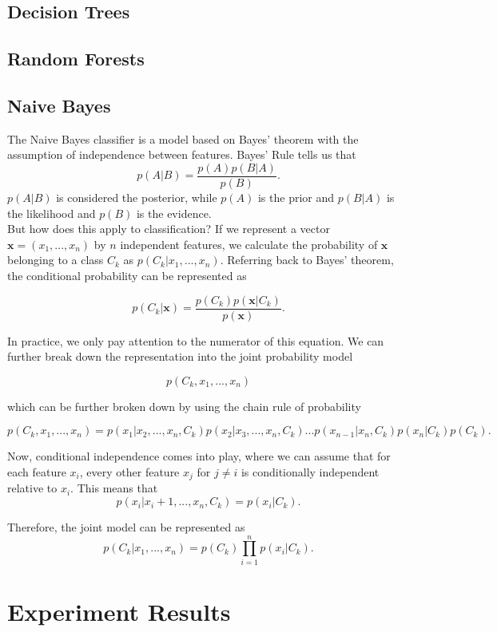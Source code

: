 \documentclass[11pt, letterpaper]{article}
\renewcommand{\vec}[1]{\mathbf{#1}}
\begin{document}
\subsection{Decision Trees}

\subsection{Random Forests}

\subsection{Naive Bayes}

The Naive Bayes classifier is a model based on Bayes' theorem with the assumption of independence between features. Bayes' Rule tells us that
$$p(A | B) = \frac{p(A)p(B | A) }{p(B)}.$$
$p(A|B)$ is considered the posterior, while $p(A)$ is the prior and $p(B | A)$ is the likelihood and $p(B)$ is the evidence. \\

But how does this apply to classification? If we represent a vector $\vec{x} = (x_1,...,x_n)$ by $n$ independent features, we calculate the probability of $\vec{x}$ belonging to a class $C_k$ as $p(C_k | x_1,...,x_n)$. Referring back to Bayes' theorem, the conditional probability can be represented as

$$p(C_k | \vec{x}) = \frac{p(C_k)p(\vec{x} | C_k)}{p(\vec{x})}.$$

In practice, we only pay attention to the numerator of this equation. We can further break down the representation into the joint probability model

$$p(C_k, x_1,...,x_n)$$

which can be further broken down by using the chain rule of probability


$$p(C_k, x_1,..., x_n) = p(x_1 | x_2,...,x_n, C_k)p(x_2 | x_3,...,x_n, C_k)...p(x_{n-1} | x_n, C_k)p(x_n | C_k)p(C_k).$$ 

Now, conditional independence comes into play, where we can assume that for each feature $x_i$, every other feature $x_j$ for $j \neq i$ is conditionally independent relative to $x_i$. This means that 
$$p(x_i | x_i+1,...,x_n, C_k) = p(x_i | C_k).$$

Therefore, the joint model can be represented as $$p(C_k | x_1,...,x_n) = p(C_k) \prod_{i=1}^{n}p(x_i | C_k).$$

\section{Experiment Results}
\end{document}
